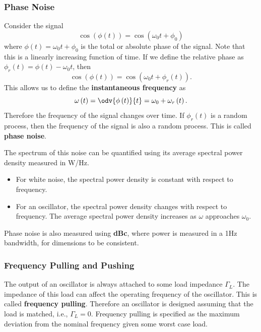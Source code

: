 \documentclass{article}
\begin{document}
\subsubsection{Phase Noise}
Consider the signal
\begin{equation*}
    \cos{\left( \phi\left( t \right) \right)} = \cos{\left( \omega_0 t + \phi_0 \right)}
\end{equation*}
where \(\phi\left( t \right) = \omega_0 t + \phi_0\) is the total or
absolute phase of the signal. Note that this is a linearly increasing
function of time. If we define the relative phase as
\(\phi_r\left( t \right) = \phi\left( t \right) - \omega_0 t\), then
\begin{equation*}
    \cos{\left( \phi\left( t \right) \right)} = \cos{\left( \omega_0 t + \phi_r\left( t \right) \right)}.
\end{equation*}
This allows us to define the \textbf{instantaneous frequency} as
\begin{equation*}
    \omega\left( t \right) = \odv{\phi\left( t \right)}{t} = \omega_0 + \omega_r\left( t \right).
\end{equation*}
Therefore the frequency of the signal changes over time. If \(\phi_r\left( t \right)\)
is a random process, then the frequency of the signal is also a random
process. This is called \textbf{phase noise}.

The spectrum of this noise can be quantified using its average spectral
power density measured in \unit{W/Hz}.
\begin{itemize}
    \item For white noise, the spectral power density is constant with
          respect to frequency.
    \item For an oscillator, the spectral power density changes with
          respect to frequency. The average spectral power density
          increases as \(\omega\) approaches \(\omega_0\).
\end{itemize}
Phase noise is also measured using \textbf{dBc}, where power is measured
in a 1Hz bandwidth, for dimensions to be consistent.
\subsubsection{Frequency Pulling and Pushing}
The output of an oscillator is always attached to some load impedance
\(\Gamma_L\). The impedance of this load can affect the operating
frequency of the oscillator. This is called \textbf{frequency pulling}.
Therefore an oscillator is designed assuming that the load is matched,
i.e., \(\Gamma_L = 0\). Frequency pulling is specified as the maximum
deviation from the nominal frequency given some worst case load.
\end{document}
